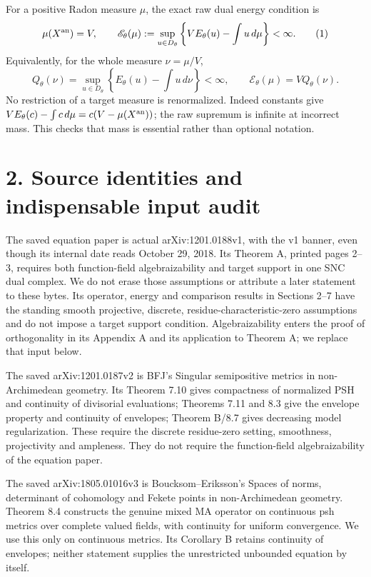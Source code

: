 \documentclass[11pt]{article}
\begin{document}
For a positive Radon measure \(\mu\), the exact raw dual energy condition is
\[
 \mu(X^{\rm an})=V,\qquad
 \mathscr E_\theta(\mu):=
 \sup_{u\in D_\theta}\left\{VE_\theta(u)-\int u\,d\mu\right\}<\infty.
 \tag{1}
\]
Equivalently, for the whole measure \(\nu=\mu/V\),
\[
 Q_\theta(\nu)=\sup_{u\in D_\theta}
 \left\{E_\theta(u)-\int u\,d\nu\right\}<\infty,
 \qquad\mathscr E_\theta(\mu)=VQ_\theta(\nu).
 \tag{2}
\]
No restriction of a target measure is renormalized. Indeed constants give \(VE_\theta(c)-\int c\,d\mu=c(V-\mu(X^{\rm an}))\); the raw supremum is infinite at incorrect mass. This checks that mass is essential rather than optional notation.

\section*{2. Source identities and indispensable input audit}

The saved equation paper is actual arXiv:1201.0188v1, with the v1 banner, even though its internal date reads October 29, 2018. Its Theorem A, printed pages 2--3, requires both function-field algebraizability and target support in one SNC dual complex. We do not erase those assumptions or attribute a later statement to these bytes. Its operator, energy and comparison results in Sections 2--7 have the standing smooth projective, discrete, residue-characteristic-zero assumptions and do not impose a target support condition. Algebraizability enters the proof of orthogonality in its Appendix A and its application to Theorem A; we replace that input below.

The saved arXiv:1201.0187v2 is BFJ's Singular semipositive metrics in non-Archimedean geometry. Its Theorem 7.10 gives compactness of normalized PSH and continuity of divisorial evaluations; Theorems 7.11 and 8.3 give the envelope property and continuity of envelopes; Theorem B/8.7 gives decreasing model regularization. These require the discrete residue-zero setting, smoothness, projectivity and ampleness. They do not require the function-field algebraizability of the equation paper.

The saved arXiv:1805.01016v3 is Boucksom--Eriksson's Spaces of norms, determinant of cohomology and Fekete points in non-Archimedean geometry. Theorem 8.4 constructs the genuine mixed MA operator on continuous psh metrics over complete valued fields, with continuity for uniform convergence. We use this only on continuous metrics. Its Corollary B retains continuity of envelopes; neither statement supplies the unrestricted unbounded equation by itself.
\end{document}
